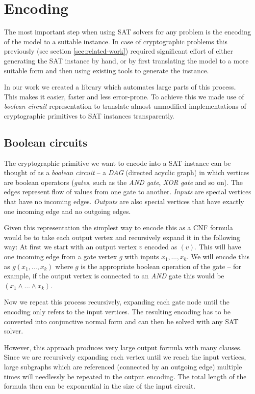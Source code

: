 \section{Encoding}
The most important step when using SAT solvers for any problem is the encoding of the model to a suitable instance.
In case of cryptographic problems this previously (see section \ref{sec:related-work}) required significant effort of either generating the SAT instance by hand, or by first translating the model to a more suitable form and then using existing tools to generate the instance.

In our work we created a library \cite{papay2016code} which automates large parts of this process.
This makes it easier, faster and less error-prone.
To achieve this we made use of \emph{boolean circuit} representation to translate almost unmodified implementations of cryptographic primitives to SAT instances transparently.

\subsection{Boolean circuits}
The cryptographic primitive we want to encode into a SAT instance can be thought of as a \emph{boolean circuit} -- a \emph{DAG} (directed acyclic graph) in which vertices are boolean operators (\emph{gates}, such as the \emph{AND gate}, \emph{XOR gate} and so on).
The edges represent flow of values from one gate to another.
\emph{Inputs} are special vertices that have no incoming edges.
\emph{Outputs} are also special vertices that have exactly one incoming edge and no outgoing edges.

Given this representation the simplest way to encode this as a CNF formula would be to take each output vertex and recursively expand it in the following way:
At first we start with an output vertex $v$ encoded as $(v)$.
This will have one incoming edge from a gate vertex $g$ with inputs $x_1, \dots, x_k$.
We will encode this as $g(x_1, \dots, x_k)$ where $g$ is the appropriate boolean operation of the gate -- for example, if the output vertex is connected to an \emph{AND} gate this would be $(x_1 \land \dots \land x_k)$.

Now we repeat this process recursively, expanding each gate node until the encoding only refers to the input vertices.
The resulting encoding has to be converted into conjunctive normal form and can then be solved with any SAT solver.

However, this approach produces very large output formula with many clauses.
Since we are recursively expanding each vertex until we reach the input vertices, large subgraphs which are referenced (connected by an outgoing edge) multiple times will needlessly be repeated in the output encoding.
The total length of the formula then can be exponential in the size of the input circuit.

